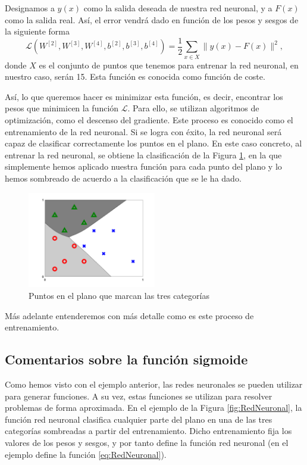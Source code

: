 \documentclass[a4paper,11pt,spanish, twoside, leqno]{tfg-uam}
\theoremstyle{definition}
\begin{document}
Designamos a $y(x)$ como la salida deseada de nuestra red neuronal, y a $F(x)$ como la salida real. Así, el error vendrá dado en función de los pesos y sesgos de la siguiente forma
\begin{equation*}
    \mathcal{L}(W^{[2]},W^{[3]},W^{[4]},b^{[2]},b^{[3]},b^{[4]})=\frac{1}{2}\sum_{x\in X}\|y(x)-F(x)\|^2,
\end{equation*}
donde $X$ es el conjunto de puntos que tenemos para entrenar la red neuronal, en nuestro caso, serán 15. Esta función es conocida como función de coste.

Así, lo que queremos hacer es minimizar esta función, es decir, encontrar los pesos que minimicen la función $\mathcal{L}$. Para ello, se utilizan algoritmos de optimización, como el descenso del gradiente. Este proceso es conocido como el entrenamiento de la red neuronal. Si se logra con éxito, la red neuronal será capaz de clasificar correctamente los puntos en el plano. En este caso concreto, al entrenar la red neuronal, se obtiene la clasificación de la Figura \ref{fig:ClasificacionFinal}, en la que simplemente hemos aplicado nuestra función para cada punto del plano y lo hemos sombreado de acuerdo a la clasificación que se le ha dado.

\begin{figure}
    \centering
    \label{fig:ClasificacionFinal}
    \includegraphics[width=0.5\textwidth]{Figuras/classifier_back.png}
    \caption{Puntos en el plano que marcan las tres categorías}
\end{figure}

Más adelante entenderemos con más detalle como es este proceso de entrenamiento.

\subsection{Comentarios sobre la función sigmoide}\label{subsec:Sigmoide}
Como hemos visto con el ejemplo anterior, las redes neuronales se pueden utilizar para generar funciones. A su vez, estas funciones se utilizan para resolver problemas de forma aproximada. En el ejemplo de la Figura \ref{fig:RedNeuronal}, la función red neuronal clasifica cualquier parte del plano en una de las tres categorías sombreadas a partir del entrenamiento. Dicho entrenamiento fija los valores de los pesos y sesgos, y por tanto define la función red neuronal (en el ejemplo define la función \eqref{eq:RedNeuronal}).
\end{document}
